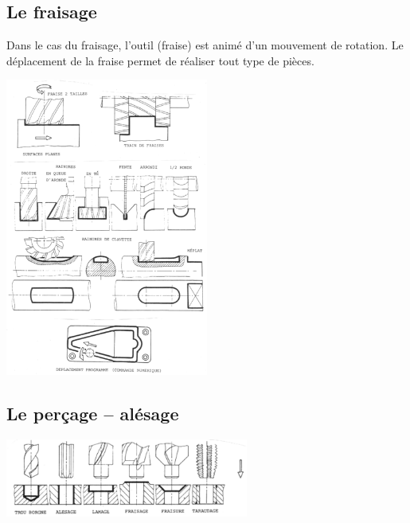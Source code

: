 \documentclass[11pt,oneside]{article}
\begin{document}
\subsection{Le fraisage}

Dans le cas du fraisage, l'outil (fraise) est animé d'un mouvement de rotation. Le déplacement de la fraise permet de réaliser tout type de pièces. 
\begin{center}
\includegraphics[width=0.5\textwidth]{png/fraisage}
\end{center}

\subsection{Le perçage -- alésage}

\begin{center}
\includegraphics[width=0.6\textwidth]{png/percage}
\end{center}
\end{document}
